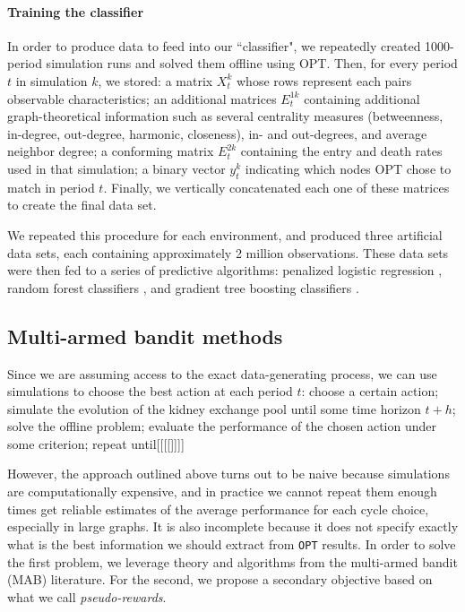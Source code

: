 \begin{itemize}
\paragraph{Training the classifier} In order to produce data to feed into our ``classifier", we repeatedly created 1000-period simulation runs and solved them offline using \textsc{OPT}. Then, for every period $t$ in simulation $k$, we stored: a matrix $X_t^{k}$ whose rows represent each pairs observable characteristics; an additional matrices $E_{t}^{1k}$ containing additional graph-theoretical information such as several centrality measures (betweenness, in-degree, out-degree, harmonic, closeness), in- and out-degrees, and average neighbor degree; a conforming matrix $E_{t}^{2k}$ containing the entry and death rates used in that simulation; a binary vector $y_t^{k}$ indicating which nodes \textsc{OPT} chose to match in period $t$. Finally, we vertically concatenated each one of these matrices to create the final data set.

We repeated this procedure for each environment, and produced three artificial data sets, each containing approximately 2 million observations. These data sets were then fed to a series of predictive algorithms: penalized logistic regression \citep{wu2009genome}, random forest classifiers \citep{breiman2001random}, and gradient tree boosting classifiers \citep{friedman2001greedy}. 



\subsection{Multi-armed bandit methods}

Since we are assuming access to the exact data-generating process, we can use simulations to choose the best action at each period $t$: choose a certain action; simulate the evolution of the kidney exchange pool until some time horizon $t + h$; solve the offline problem; evaluate the performance of the chosen action under some criterion; repeat until[[[[]]]]

However, the approach outlined above turns out to be naive because simulations are computationally expensive, and in practice we cannot repeat them enough times get reliable estimates of the average performance for each cycle choice, especially in large graphs. It is also incomplete because it does not specify exactly what is the best information we should extract from \texttt{OPT} results. In order to solve the first problem, we leverage theory and algorithms from the multi-armed bandit (MAB) literature. For the second, we propose a secondary objective based on what we call \emph{pseudo-rewards}.


\end{itemize}
